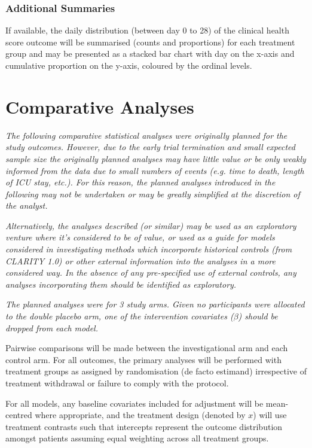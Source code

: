 \documentclass[11pt,parskip=half-]{scrartcl}
\begin{document}
\subsubsection{Additional Summaries}

If available, the daily distribution (between day 0 to 28) of the clinical health score outcome will be summarised (counts and proportions) for each treatment group and may be presented as a stacked bar chart with day on the x-axis and cumulative proportion on the y-axis, coloured by the ordinal levels.

\clearpage

\section{Comparative Analyses}

\textit{The following comparative statistical analyses were originally planned for the study outcomes. However, due to the early trial termination and small expected sample size the originally planned analyses may have little value or be only weakly informed from the data due to small numbers of events (e.g. time to death, length of ICU stay, etc.). For this reason, the planned analyses introduced in the following may not be undertaken or may be greatly simplified at the discretion of the analyst.}

\textit{Alternatively, the analyses described (or similar) may be used as an exploratory venture where it's considered to be of value, or used as a guide for models considered in investigating methods which incorporate historical controls (from CLARITY 1.0) or other external information into the analyses in a more considered way. In the absence of any pre-specified use of external controls, any analyses incorporating them should be identified as exploratory.}

\textit{The planned analyses were for 3 study arms. Given no participants were allocated to the double placebo arm, one of the intervention covariates ($\beta$) should be dropped from each model.}

Pairwise comparisons will be made between the investigational arm and each control arm. For all outcomes, the primary analyses will be performed with treatment groups as assigned by randomisation (de facto estimand) irrespective of treatment withdrawal or failure to comply with the protocol.

For all models, any baseline covariates included for adjustment will be mean-centred where appropriate, and the treatment design (denoted by $x$) will use treatment contrasts such that intercepts represent the outcome distribution amongst patients assuming equal weighting across all treatment groups.
\end{document}
